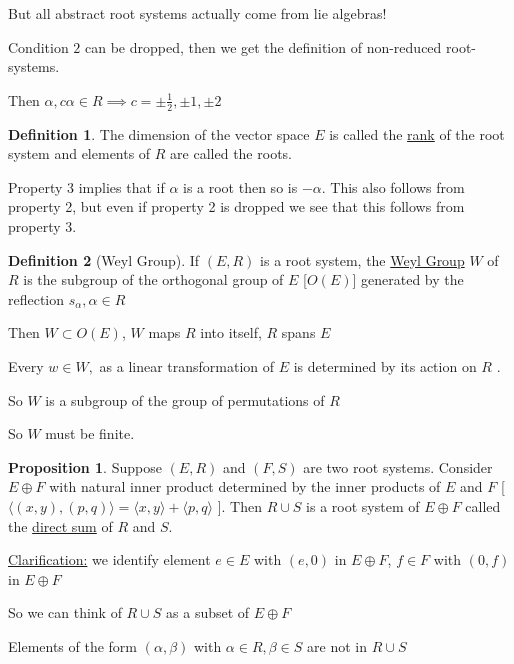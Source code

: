 \documentclass{article}
\theoremstyle{definition}
\newtheorem{definition}{Definition}
\newtheorem{proposition}{Proposition}
\begin{document}
But all abstract root systems actually come from lie algebras!

Condition \(2\) can be dropped, then we get the definition of non-reduced root-systems.

Then \(\alpha , c \alpha \in R \implies c = \pm \frac{1}{2}, \pm 1, \pm 2\)

\begin{definition}

    The dimension of the vector space \(E\) is called the \underline{rank} of the root system and elements of \(R\) are called the roots.

\end{definition}

Property 3 implies that if \(\alpha \) is a root then so is \(-\alpha \). This also follows from property 2, but even if property 2 is dropped we see that this follows from property 3.

\begin{definition}
    [Weyl Group] If \((E,R)\) is a root system, the \underline{Weyl Group} \(W\) of \(R\) is the subgroup of the orthogonal group of \(E\) [\(O(E)\)] generated by the reflection \(s_\alpha, \alpha \in R\) 
\end{definition}

Then \(W \subset O(E)\), \(W\) maps \(R\) into itself, \(R\) spans \(E\) 

Every \(w\in W,\) as a linear transformation of \(E\) is determined by its action on \(R\) .

So \(W\) is a subgroup of the group of permutations of \(R\) 

So \(W\) must be finite.

\begin{proposition}
    Suppose \((E,R)\) and \((F,S)\) are two root systems. Consider \(E \oplus F\) with natural inner product determined by the inner products of \(E\) and \(F\) [\(\langle (x,y),(p,q) \rangle = \langle x,y \rangle + \langle p,q \rangle  \) ]. Then \(R \cup S\) is a root system of \(E \oplus F\) called the \underline{direct sum} of \(R\) and \(S\).
\end{proposition}

\underline{Clarification:} we identify element \(e\in E\) with \((e,0)\) in \(E \oplus F\), \(f\in F\) with \((0,f)\) in \(E \oplus F\) 

So we can think of \(R \cup S\) as a subset of \(E \oplus F\) 

Elements of the form \( (\alpha ,\beta )\) with \(\alpha \in R,\beta \in S\) are not in \(R \cup S\) 
\end{document}
